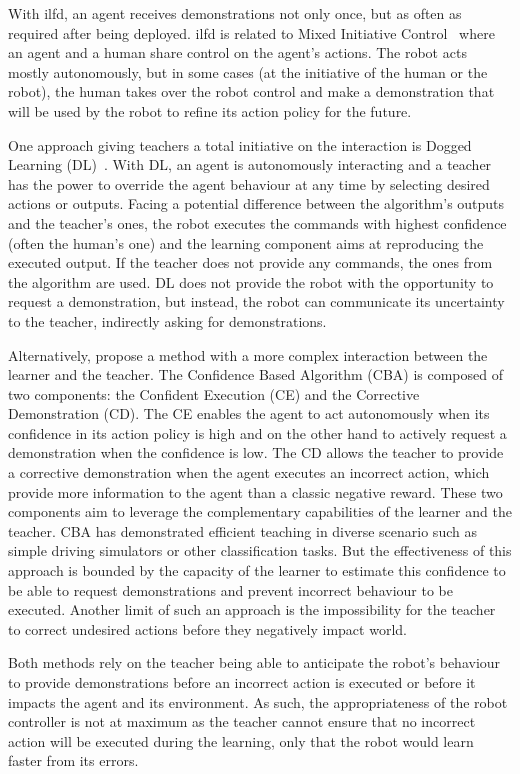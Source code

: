 With \gls{ilfd}, an agent receives demonstrations not only once, but as often as required after being deployed. \gls{ilfd} is related to Mixed Initiative Control~\citep{adams2004mixed} where an agent and a human share control on the agent's actions. The robot acts mostly autonomously, but in some cases (at the initiative of the human or the robot), the human takes over the robot control and make a demonstration that will be used by the robot to refine its action policy for the future.

One approach giving teachers a total initiative on the interaction is Dogged Learning (DL)~\citep{grollman2007dogged}. With DL, an agent is autonomously interacting and a teacher has the power to override the agent behaviour at any time by selecting desired actions or outputs. Facing a potential difference between the algorithm's outputs and the teacher's ones, the robot executes the commands with highest confidence (often the human's one) and the learning component aims at reproducing the executed output. If the teacher does not provide any commands, the ones from the algorithm are used. DL does not provide the robot with the opportunity to request a demonstration, but instead, the robot can communicate its uncertainty to the teacher, indirectly asking for demonstrations. 

Alternatively, \cite{chernova2009interactive} propose a method with a more complex interaction between the learner and the teacher. The Confidence Based Algorithm (CBA) is composed of two components: the Confident Execution (CE) and the Corrective Demonstration (CD). The CE enables the agent to act autonomously when its confidence in its action policy is high and on the other hand to actively request a demonstration when the confidence is low. The CD allows the teacher to provide a corrective demonstration when the agent executes an incorrect action, which provide more information to the agent than a classic negative reward. These two components aim to leverage the complementary capabilities of the learner and the teacher. CBA has demonstrated efficient teaching in diverse scenario such as simple driving simulators or other classification tasks. But the effectiveness of this approach is bounded by the capacity of the learner to estimate this confidence to be able to request demonstrations and prevent incorrect behaviour to be executed. Another limit of such an approach is the impossibility for the teacher to correct undesired actions before they negatively impact world. 

Both methods rely on the teacher being able to anticipate the robot's behaviour to provide demonstrations before an incorrect action is executed or before it impacts the agent and its environment. As such, the appropriateness of the robot controller is not at maximum as the teacher cannot ensure that no incorrect action will be executed during the learning, only that the robot would learn faster from its errors.

